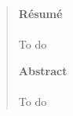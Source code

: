 \cleardoublepage{}

\thispagestyle{plain}

\hspace{3cm}

\begin{quote}

\begin{otherlanguage}{french}

\begin{center}
  \textbf{Résumé}
\end{center}


\paragraph{}
To do

\end{otherlanguage}

\begin{center}
  \textbf{Abstract}
\end{center}

\paragraph{}
To do

\end{quote}
